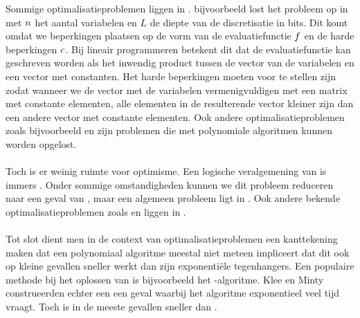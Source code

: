 Sommige optimalisatieproblemen liggen in . \cite{linearProgrammingInP} bijvoorbeeld lost het  probleem op in  met $n$ het aantal variabelen en $L$ de diepte van de discretisatie in bits. Dit komt omdat we beperkingen plaatsen op de vorm van de evaluatiefunctie $f$ en de harde beperkingen $c$. Bij lineair programmeren betekent dit dat de evaluatiefunctie kan geschreven worden als het inwendig product tussen de vector van de variabelen en een vector met constanten. Het harde beperkingen moeten voor te stellen zijn zodat wanneer we de vector met de variabelen vermenigvuldigen met een matrix met constante elementen, alle elementen in de resulterende vector kleiner zijn dan een andere vector met constante elementen. Ook andere optimalisatieproblemen zoals bijvoorbeeld  en  zijn problemen die met polynomiale algoritmen kunnen worden opgelost.

\paragraph{}
Toch is er weinig ruimte voor optimisme. Een logische veralgemening van  is immers . Onder sommige omstandigheden kunnen we dit probleem reduceren naar een geval van \cite{Kozlov1980223}, maar een algemeen  probleem ligt in \cite{qpInNP}. Ook andere bekende optimalisatieproblemen zoals  en  liggen in .

\paragraph{}
Tot slot dient men in de context van optimalisatieproblemen een kanttekening maken dat een polynomiaal algoritme meestal niet meteen impliceert dat dit ook op kleine gevallen sneller werkt dan zijn exponenti\"ele tegenhangers. Een populaire methode bij het oplossen van  is bijvoorbeeld het -algoritme. Klee en Minty\cite{klee:1972} construeerden echter een een geval waarbij het algoritme exponentieel veel tijd vraagt. Toch is  in de meeste gevallen sneller dan .